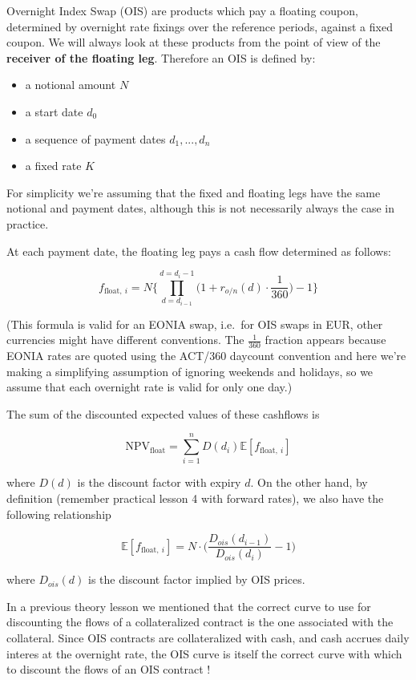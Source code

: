 \documentclass[11pt]{article}
\providecommand{\tightlist}{%
      \setlength{\itemsep}{0pt}\setlength{\parskip}{0pt}}
\begin{document}
Overnight Index Swap (OIS) are products which pay a floating coupon,
determined by overnight rate fixings over the reference periods, against
a fixed coupon. We will always look at these products from the point of
view of the \textbf{receiver of the floating leg}. Therefore an OIS is
defined by:

\begin{itemize}
\tightlist
\item
  a notional amount \(N\)
\item
  a start date \(d_0\)
\item
  a sequence of payment dates \(d_1,...,d_n\)
\item
  a fixed rate \(K\)
\end{itemize}

For simplicity we're assuming that the fixed and floating legs have the
same notional and payment dates, although this is not necessarily always
the case in practice.

At each payment date, the floating leg pays a cash flow determined as
follows:

\[f_{\mathrm{float},~i} = N \Bigg\{\prod_{d=d_{i-1}}^{d=d_i-1}\Big(1+r_{o/n}(d)\cdot\frac{1}{360}\Big) -1 \Bigg\}\]

(This formula is valid for an EONIA swap, i.e.~for OIS swaps in EUR,
other currencies might have different conventions. The \(\frac{1}{360}\)
fraction appears because EONIA rates are quoted using the ACT/360
daycount convention and here we're making a simplifying assumption of
ignoring weekends and holidays, so we assume that each overnight rate is
valid for only one day.)

The sum of the discounted expected values of these cashflows is

\[\mathrm{NPV}_{\mathrm{float}} = \sum_{i=1}^{n}D(d_i)\mathbb{E}[f_{\mathrm{float},~i}]\]

where \(D(d)\) is the discount factor with expiry \(d\). On the other
hand, by definition (remember practical lesson 4 with forward rates), we
also have the following relationship

\[\mathbb{E}[f_{\mathrm{float},~i}] = N\cdot\Big(\frac{D_{ois}(d_{i-1})}{D_{ois}(d_{i})} - 1\Big) \]

where \(D_{ois}(d)\) is the discount factor implied by OIS prices.

In a previous theory lesson we mentioned that the correct curve to use
for discounting the flows of a collateralized contract is the one
associated with the collateral. Since OIS contracts are collateralized
with cash, and cash accrues daily interes at the overnight rate, the OIS
curve is itself the correct curve with which to discount the flows of an
OIS contract !
\end{document}
